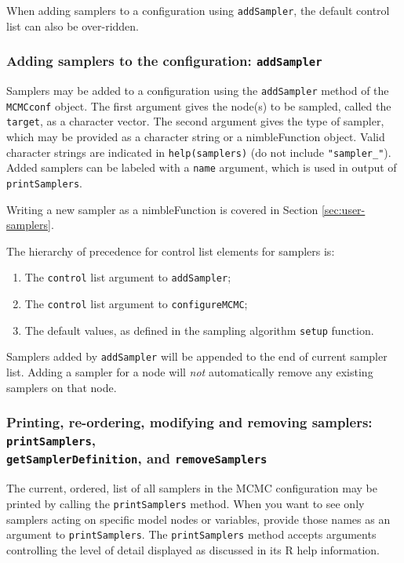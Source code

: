 \documentclass[12pt,oneside]{book}\usepackage[]{graphicx}\usepackage[]{color}
\def\cd#1{\texttt{#1}}
\begin{document}
When adding samplers to a configuration using \cd{addSampler}, the default control list can also be over-ridden.

\subsubsection{Adding samplers to the configuration: \cd{addSampler}}

Samplers may be added to a configuration using the \cd{addSampler} method of the \cd{MCMCconf} object.  The first argument gives the node(s) to be sampled, called the \cd{target}, as a character vector.   The second argument gives the type of sampler, which may be provided as a character string or a nimbleFunction object. Valid character strings are indicated in \cd{help(samplers)} (do not include \cd{"sampler\_"}).  Added samplers can be labeled with a \cd{name} argument, which is used in output of \cd{printSamplers}.

Writing a new sampler as a nimbleFunction is covered in Section \ref{sec:user-samplers}.

The hierarchy of precedence for control list elements for samplers is:

\begin{enumerate}
\item The \cd{control} list argument to \cd{addSampler};
\item The \cd{control} list argument to \cd{configureMCMC};
\item The default values, as defined in the sampling algorithm \cd{setup} function.
\end{enumerate}

Samplers added by \cd{addSampler} will be appended to the end of current sampler list.  Adding a sampler for a node will \emph{not} automatically remove any existing samplers on that node. 

\subsubsection{Printing, re-ordering, modifying and removing samplers: \cd{printSamplers},\\\cd{getSamplerDefinition}, and \cd{removeSamplers}}

The current, ordered, list of all samplers in the MCMC configuration may be printed by calling the \cd{printSamplers} method. When you want to see only samplers acting on specific model nodes or variables, provide those names as an argument to \cd{printSamplers}.  The \cd{printSamplers} method accepts arguments controlling the level of detail displayed as discussed in its R help information.
\end{document}
